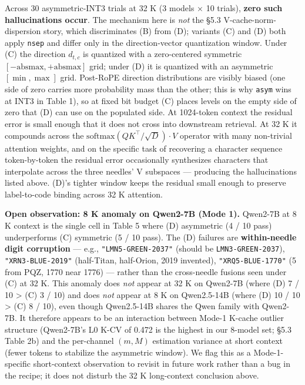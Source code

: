 \documentclass[
]{article}
\begin{document}
Across 30 asymmetric-INT3 trials at 32 K (3 models × 10 trials),
\textbf{zero such hallucinations occur}. The mechanism here is
\emph{not} the §5.3 V-cache-norm-dispersion story, which discriminates
(B) from (D); variants (C) and (D) both apply \texttt{nsep} and differ
only in the direction-vector quantization window. Under (C) the
direction \(d_{t,c}\) is quantized with a zero-centered symmetric
\([-\text{absmax}, +\text{absmax}]\) grid; under (D) it is quantized
with an asymmetric \([\min, \max]\) grid. Post-RoPE direction
distributions are visibly biased (one side of zero carries more
probability mass than the other; this is why \texttt{asym} wins at INT3
in Table 1), so at fixed bit budget (C) places levels on the empty side
of zero that (D) can use on the populated side. At 1024-token context
the residual error is small enough that it does not cross into
downstream retrieval. At 32 K it compounds across the
\(\mathrm{softmax}(QK^\top/\sqrt{D}) \cdot V\) operator with many
non-trivial attention weights, and on the specific task of recovering a
character sequence token-by-token the residual error occasionally
synthesizes characters that interpolate across the three needles' V
subspaces --- producing the hallucinations listed above. (D)'s tighter
window keeps the residual small enough to preserve label-to-code binding
across 32 K attention.

\textbf{Open observation: 8 K anomaly on Qwen2-7B (Mode 1).} Qwen2-7B at
8 K context is the single cell in Table 5 where (D) asymmetric (4 / 10
pass) underperforms (C) symmetric (5 / 10 pass). The (D) failures are
\textbf{within-needle digit corruption} --- e.g.,
\texttt{"LMN5-GREEN-2037"} (should be \texttt{LMN3-GREEN-2037}),
\texttt{"XRN3-BLUE-2019"} (half-Titan, half-Orion, 2019 invented),
\texttt{"XRQ5-BLUE-1770"} (5 from PQZ, 1770 near 1776) --- rather than
the cross-needle fusions seen under (C) at 32 K. This anomaly does
\emph{not} appear at 32 K on Qwen2-7B (where (D) 7 / 10 \textgreater{}
(C) 3 / 10) and does \emph{not} appear at 8 K on Qwen2.5-14B (where (D)
10 / 10 \textgreater{} (C) 8 / 10), even though Qwen2.5-14B shares the
Qwen family with Qwen2-7B. It therefore appears to be an interaction
between Mode-1 K-cache outlier structure (Qwen2-7B's L0 K-CV of 0.472 is
the highest in our 8-model set; §5.3 Table 2b) and the per-channel
\((m, M)\) estimation variance at short context (fewer tokens to
stabilize the asymmetric window). We flag this as a Mode-1-specific
short-context observation to revisit in future work rather than a bug in
the recipe; it does not disturb the 32 K long-context conclusion above.
\end{document}
